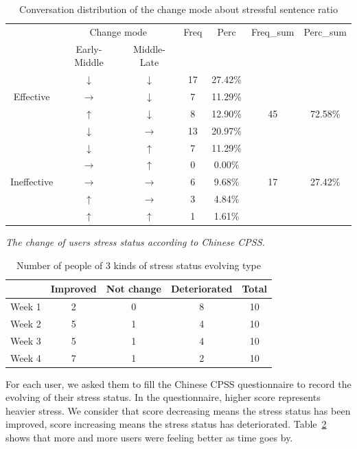 \begin{table}
 \caption{Conversation distribution  of the change mode about stressful sentence ratio}
\centering
\begin{tabular}{c|c|c|c|c|c|c}
\hline
&\multicolumn{2}{|c|}{Change mode}&Freq&Perc&Freq\_sum&Perc\_sum
\\\cline{2-3}
 &Early-Middle &Middle-Late  &&&&
\\\hline
 &$\downarrow$&$\downarrow$&17&27.42\%&&
\\\cline{2-5}
Effective&$\rightarrow$&$\downarrow$&7&11.29\%&&
\\\cline{2-5}
&$\uparrow$&$\downarrow$&8&12.90\%&45&72.58\%
\\\cline{2-5}
&$\downarrow$&$\rightarrow$&13&20.97\%&&
\\\hline
&$\downarrow$&$\uparrow$&7&11.29\%&&
\\\cline{2-5}
&$\rightarrow$&$\uparrow$&0&0.00\%&&
\\\cline{2-5}
Ineffective&$\rightarrow$&$\rightarrow$&6&9.68\%&17&27.42\%
\\\cline{2-5}
&$\uparrow$&$\rightarrow$&3&4.84\%&&
\\\cline{2-5}
&$\uparrow$&$\uparrow$&1&1.61\%&&
\\\hline
\end{tabular}
\label{tab:changemode}
\end{table}

\textit{The change of users stress status according to Chinese CPSS.}
\begin{table}
 \caption{Number of people of 3 kinds of stress status evolving type}
\centering
\begin{tabular}{c|c|c|c|c}
\hline
 &Improved&Not change&Deteriorated&Total
\\\hline
 Week 1&2&0&8&10
\\\hline
Week 2&5&1&4&10
\\\hline
Week 3&5&1&4&10
\\\hline
Week 4&7&1&2&10
\\\hline
\end{tabular}
\label{tab:CPSS}
\end{table}
For each user, we asked them to fill the Chinese CPSS questionnaire to record the evolving of their stress status. In the questionnaire, higher score represents heavier stress. We consider that score decreasing means the stress status has been improved, score increasing means the stress status has deteriorated. Table~\ref{tab:CPSS} shows that more and more users were feeling better as time goes by.
